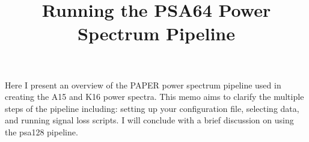 \documentclass[onecolumn]{emulateapj}
\begin{document}
\title{Running the PSA64 Power Spectrum Pipeline}



	
	
	
\maketitle	
Here I present an overview of the PAPER power spectrum pipeline used in creating the A15 and K16 power spectra. This memo aims to clarify the multiple steps of the pipeline including: setting up your configuration file, selecting data, and running signal loss scripts. I will conclude with a brief discussion on using the psa128 pipeline.
\newline
\end{document}
